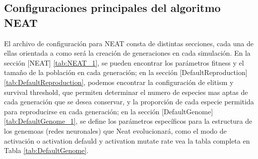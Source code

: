 \documentclass[lettersize, journal]{IEEEtran}
\begin{document}

\subsection{Configuraciones principales del algoritmo NEAT}
El archivo de configuración para NEAT consta de distintas secciones, cada una de ellas orientada a como será la creación de generaciones en cada simulación. En la sección [NEAT] \ref{tab:NEAT_1}, se pueden encontrar los parámetros fitness y el tamaño de la población en cada generación; en la sección [DefaultReproduction] \ref{tab:DefaultReproduction}, podemos encontrar la configuración de elitism y survival threshold, que permiten determinar el numero de especies mas aptas de cada generación que se desea conservar, y la proporción de cada especie permitida para reproducirse en cada generación; en la sección [DefaultGenome] \ref{tab:DefaultGenome_1}, se define los parámetros específicos para la estructura de los genemoas (redes neuronales) que Neat evolucionará, como el modo de activación o activation defauld y activation mutate rate vea la tabla completa en Tabla \ref{tab:DefaultGenome}.
\end{document}
